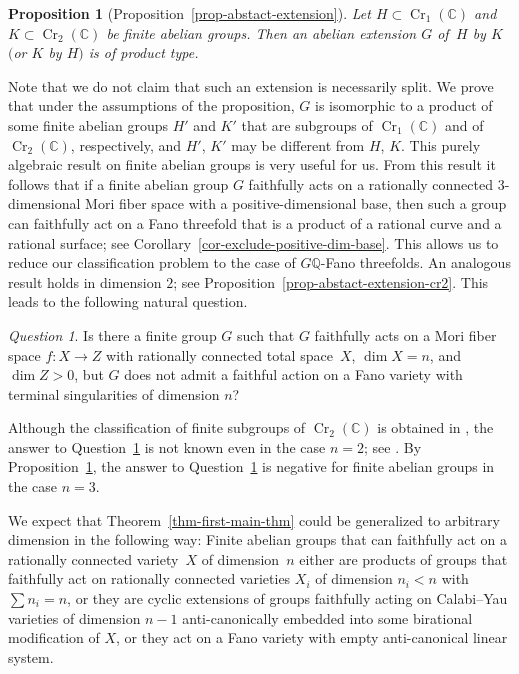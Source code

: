 \documentclass[11pt]{amsart}
\numberwithin{equation}{section}
\newtheorem{proposition}[thm]{Proposition}
\theoremstyle{definition}
\theoremstyle{remark}
\newtheorem{question}[thm]{Question}
\DeclareMathOperator{\Cr}{Cr}
\begin{document}
\begin{proposition}[{Proposition~\ref{prop-abstact-extension}}]
\label{prop-abstact-extension-intro}
Let $H\subset \Cr_1(\mathbb{C})$ and $K\subset \Cr_2(\mathbb{C})$ be finite abelian groups. Then an abelian extension $G$ of\, $H$ by $K$ $($or $K$ by $H)$ is of product type.
\end{proposition}

Note that we do not claim that such an extension is necessarily split. We prove that under the assumptions of the proposition, $G$ is isomorphic to a product of some finite abelian groups $H'$ and $K'$ that are subgroups of $\Cr_1(\mathbb{C})$ and of $\Cr_2(\mathbb{C})$, respectively, and $H'$, $K'$ may be different from $H$, $K$.  This purely algebraic result on finite abelian groups is very useful for us. From this result it follows that if a finite abelian group $G$ faithfully acts on a rationally connected $3$-dimensional Mori fiber space with a positive-dimensional base, then such a group can faithfully act on a Fano threefold that is a product of a rational curve and a rational surface; see Corollary~\ref{cor-exclude-positive-dim-base}. This allows us to reduce our classification problem to the case of $G\mathbb{Q}$-Fano threefolds.  An analogous result holds in dimension $2$; see Proposition~\ref{prop-abstact-extension-cr2}.  This leads to the following natural question.

\begin{question}
\label{second-question}
Is there a finite group $G$ such that $G$ faithfully acts on a Mori fiber space $f\colon X\to Z$ with rationally connected total space~$X$, $\dim X=n$, and $\dim Z>0$, but $G$ does not admit a faithful action on a Fano variety with terminal singularities of dimension $n$?
\end{question}

Although the classification of finite subgroups of $\Cr_2(\mathbb{C})$ is obtained in \cite{DI09}, the answer to Question~\ref{second-question} is not known even in the case $n=2$; see \cite[Section 5.7]{DI09}.  By Proposition~\ref{prop-abstact-extension-intro}, the answer to Question~\ref{second-question} is negative for finite abelian groups in the case $n=3$.

We expect that Theorem~\ref{thm-first-main-thm} could be generalized to arbitrary dimension in the following way: Finite abelian groups that can faithfully act on a rationally connected variety~$X$ of dimension~$n$ either are products of groups that faithfully act on rationally connected varieties $X_i$ of dimension $n_i < n$ with $\sum n_i=n$, or they are cyclic extensions of groups faithfully acting on Calabi--Yau varieties of dimension $n-1$ anti-canonically embedded into some birational modification of $X$, or they act on a Fano variety with empty anti-canonical linear system.
\end{document}
